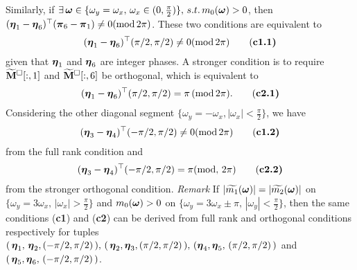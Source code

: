 Similarly, if $\exists\,\boldsymbol{\omega}\in \{\omega_y = \omega_x,\, \omega_x\in(0,\frac{\pi}{2})\},\, s.t.\, m_0(\boldsymbol{\omega}) > 0$, then $(\boldsymbol{\eta}_1-\boldsymbol{\eta}_6)^\top (\boldsymbol{\pi}_6-\boldsymbol{\pi}_1)\neq 0(\text{mod}\,2\pi)$. These two conditions are equivalent to 
\begin{align*}
(\boldsymbol{\eta}_1-\boldsymbol{\eta}_6)^\top(\pi/2,\pi/2)\neq 0 (\text{mod}\,2\pi)\tag{\bf c1.1}
\end{align*}
given that $\boldsymbol{\eta}_1$ and $\boldsymbol{\eta}_6$ are integer phases.
A stronger condition is to require $\widetilde{\mathbf{M}}^{\Box}[:,1]$ and $\widetilde{\mathbf{M}}^{\Box}[:,6]$ be orthogonal, which is equivalent to 
\begin{align*}
(\boldsymbol{\eta}_1-\boldsymbol{\eta}_6)^\top(\pi/2, \pi/2) = \pi \,(\text{mod}\, 2\pi).\tag{\bf c2.1}
\end{align*}
Considering the other diagonal segment $\{\omega_y = -\omega_x, |\omega_x| <\frac{\pi}{2}\}$, we have 
\begin{align*}
(\boldsymbol{\eta}_3-\boldsymbol{\eta}_4)^\top(-\pi/2,\pi/2)\neq 0 (\text{mod}\, 2\pi)\tag{\bf c1.2}
\end{align*}
from the full rank condition and 
\begin{align*}
(\boldsymbol{\eta}_3-\boldsymbol{\eta}_4)^\top(-\pi/2,\pi/2)=\pi(\text{mod},\,2\pi)\tag{\bf c2.2}
\end{align*} from the stronger orthogonal condition.
{\it Remark}
If $|\widetilde{m_{1}}(\boldsymbol{\omega})| = |\widetilde{m_{2}}(\boldsymbol{\omega})|$ on $\{\omega_y = 3\omega_x,\,|\omega_x| > \frac{\pi}{2}\}$ and $m_0(\boldsymbol{\omega}) > 0$ on $\{\omega_y = 3\omega_x\pm \pi,\,|\omega_y| <\frac{\pi}{2}\}$, then the same conditions ({\bf c1}) and ({\bf c2}) can be derived from full rank and orthogonal conditions respectively for tuples $(\,\boldsymbol{\eta}_1,\,\boldsymbol{\eta}_2,(-\pi/2,\pi/2)\,),\,(\,\boldsymbol{\eta}_2,\boldsymbol{\eta}_3,(\pi/2,\pi/2)\,),\,(\boldsymbol{\eta}_4,\boldsymbol{\eta}_5,\,(\pi/2,\pi/2)\,)$ and $(\,\boldsymbol{\eta}_5,\boldsymbol{\eta}_6,\,(-\pi/2,\pi/2)\,)$. 

